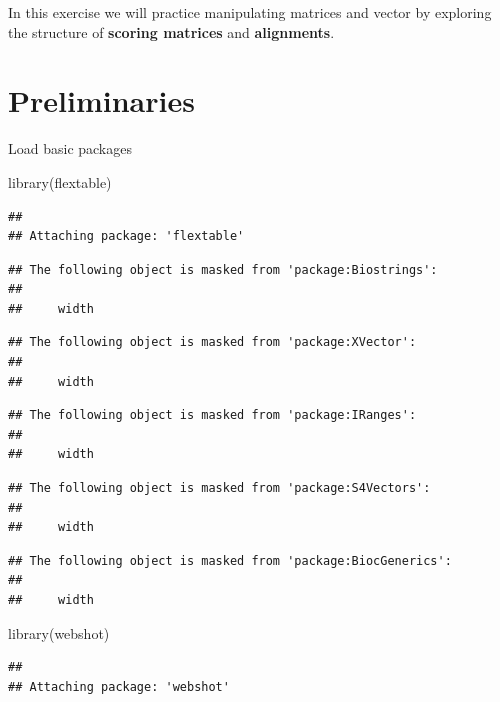 \documentclass[
]{book}
\newenvironment{Shaded}{\begin{snugshade}}{\end{snugshade}}
\newcommand{\FunctionTok}[1]{\textcolor[rgb]{0.00,0.00,0.00}{#1}}
\newcommand{\NormalTok}[1]{#1}
\begin{document}
In this exercise we will practice manipulating matrices and vector by exploring the structure of \textbf{scoring matrices} and \textbf{alignments}.

\hypertarget{preliminaries-7}{%
\section{Preliminaries}\label{preliminaries-7}}

Load basic packages

\begin{Shaded}
\begin{Highlighting}[]
\FunctionTok{library}\NormalTok{(flextable)}
\end{Highlighting}
\end{Shaded}

\begin{verbatim}
## 
## Attaching package: 'flextable'
\end{verbatim}

\begin{verbatim}
## The following object is masked from 'package:Biostrings':
## 
##     width
\end{verbatim}

\begin{verbatim}
## The following object is masked from 'package:XVector':
## 
##     width
\end{verbatim}

\begin{verbatim}
## The following object is masked from 'package:IRanges':
## 
##     width
\end{verbatim}

\begin{verbatim}
## The following object is masked from 'package:S4Vectors':
## 
##     width
\end{verbatim}

\begin{verbatim}
## The following object is masked from 'package:BiocGenerics':
## 
##     width
\end{verbatim}

\begin{Shaded}
\begin{Highlighting}[]
\FunctionTok{library}\NormalTok{(webshot)}
\end{Highlighting}
\end{Shaded}

\begin{verbatim}
## 
## Attaching package: 'webshot'
\end{verbatim}
\end{document}
